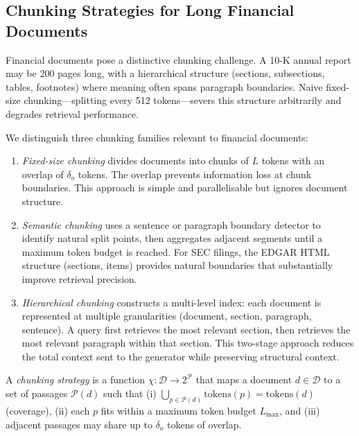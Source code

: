 \begin{deepdive}

\subsection{Chunking Strategies for Long Financial Documents}
\label{subsec:chunking}

Financial documents pose a distinctive chunking challenge. A 10-K annual report may be
200 pages long, with a hierarchical structure (sections, subsections, tables, footnotes)
where meaning often spans paragraph boundaries. Naive fixed-size chunking---splitting
every 512 tokens---severs this structure arbitrarily and degrades retrieval performance.

We distinguish three chunking families relevant to financial documents:

\begin{enumerate}
  \item \emph{Fixed-size chunking} divides documents into chunks of $L$ tokens with an
        overlap of $\delta_o$ tokens. The overlap prevents information loss at chunk
        boundaries. This approach is simple and parallelisable but ignores document
        structure.

  \item \emph{Semantic chunking} uses a sentence or paragraph boundary detector to
        identify natural split points, then aggregates adjacent segments until a maximum
        token budget is reached. For SEC filings, the EDGAR HTML structure (sections,
        items) provides natural boundaries that substantially improve retrieval precision.

  \item \emph{Hierarchical chunking} constructs a multi-level index: each document
        is represented at multiple granularities (document, section, paragraph, sentence).
        A query first retrieves the most relevant section, then retrieves the most
        relevant paragraph within that section. This two-stage approach reduces the
        total context sent to the generator while preserving structural context.
\end{enumerate}

\begin{definition}
\label{def:chunking}
A \emph{chunking strategy} is a function $\chi: \mathcal{D} \to 2^{\mathcal{P}}$
that maps a document $d \in \mathcal{D}$ to a set of passages $\mathcal{P}(d)$ such
that (i) $\bigcup_{p \in \mathcal{P}(d)} \text{tokens}(p) = \text{tokens}(d)$ (coverage),
(ii) each $p$ fits within a maximum token budget $L_{\max}$, and (iii) adjacent passages
may share up to $\delta_o$ tokens of overlap.
\end{definition}


\end{deepdive}
